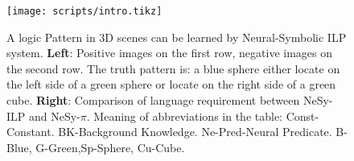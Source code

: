 \documentclass[
]{ceurart}
\begin{document}
	
	
	
	
		\begin{figure}[t]
		\centering
		\texttt{[image: scripts/intro.tikz]}
		\caption{A logic Pattern in 3D scenes can be learned by Neural-Symbolic ILP system. \textbf{Left}: Positive images on the first row, negative images on the second row. The truth pattern is: a blue sphere either locate on the left side of a green sphere or locate on the right side of a green cube. \textbf{Right}: Comparison of language requirement between NeSy-ILP and NeSy-$ \pi $. Meaning of abbreviations in the table: Const-Constant. BK-Background Knowledge. Ne-Pred-Neural Predicate. B-Blue, G-Green,Sp-Sphere, Cu-Cube. }
		\label{fig:intro}
	\end{figure}
	
\end{document}
